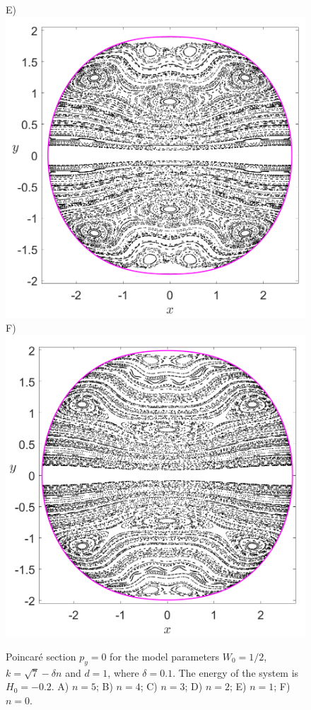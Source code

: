 \documentclass[10pt,aps,onecolumn,superscriptaddress]{revtex4-2}
\begin{document}
\begin{figure}[htbp]
	E)\includegraphics[scale=0.3]{PS_py_0_H_-0_2_w0_1div2_k_sqrt7_min_1delta_d_1.png}
	F)\includegraphics[scale=0.3]{PS_py_0_H_-0_2_w0_1div2_k_sqrt7_min_0delta_d_1.png}
	\caption{Poincar\'e section $p_y = 0$ for the model parameters $W_0 = 1/2$, $k = \sqrt{7} - \delta n$ and $d = 1$, where $\delta = 0.1$. The energy of the system is $H_0 = -0.2$. A) $n = 5$; B) $n = 4$; C) $n = 3$; D) $n = 2$; E) $n = 1$; F) $n = 0$.}
	\label{fig:psecBifProc_py_0}
\end{figure}
\end{document}
